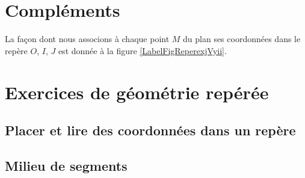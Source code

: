 \section{Compléments}

La façon dont nous associons à chaque point \( M\) du plan ses coordonnées dans le repère \( O\), \( I\), \( J\) est donnée à la figure \ref{LabelFigReperexjVyii}.
\newcommand{\CaptionFigReperexjVyii}{Lire les coordonnées du point \( M\) dans le repère \( OIJ\).}



\section{Exercices de géométrie repérée}


\subsection{Placer et lire des coordonnées dans un repère}


\subsection{Milieu de segments}


